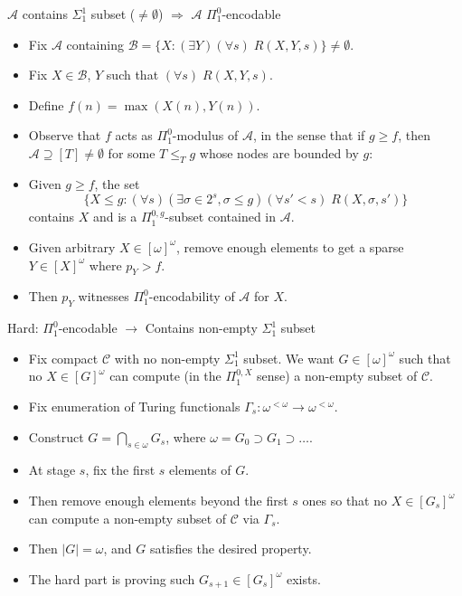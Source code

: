 \begin{frame}{$\mathcal{A}$ contains $\Sigma_1^1$ subset ($\neq\emptyset$)
$\Rightarrow$ $\mathcal{A}$ $\Pi_1^0$-encodable}
  \begin{itemize}
    \item Fix $\mathcal{A}$ containing $\mathcal{B} =\{X: (\exists
      Y)(\forall s)\; R(X,Y,s)\} \neq\emptyset$.
    \item Fix $X\in\mathcal{B}$, $Y$ such that $(\forall s)\;R(X,Y,s)$.
    \item Define $f(n)=\max(X(n),Y(n))$.
    \item Observe that $f$ acts as $\Pi_1^0$-modulus of $\mathcal{A}$, in
      the sense that if $g\geq f$, then $\mathcal{A}\supseteq[T]
      \neq\emptyset$ for some $T\leq_T g$ whose nodes are bounded by $g$:
    \item Given $g\geq f$, the set
      \[\{X\leq g:(\forall s)(\exists \sigma\in 2^s, \sigma\leq g)(\forall
      s'<s)\; R(X,\sigma,s')\}\]
      contains $X$ and is a $\Pi_1^{0,g}$-subset contained in
      $\mathcal{A}$.
    \item Given arbitrary $X\in[\omega]^\omega$, remove enough elements to
      get a sparse $Y\in[X]^\omega$ where $p_Y>f$.
    \item Then $p_Y$ witnesses $\Pi_1^0$-encodability of $\mathcal{A}$ for
      $X$.
  \end{itemize}
\end{frame}

\begin{frame}{Hard: $\Pi_1^0$-encodable $\rightarrow$ Contains
non-empty $\Sigma_1^1$ subset}
  \begin{itemize}
    \item Fix compact $\mathcal{C}$ with no non-empty $\Sigma_1^1$ subset.
      We want $G\in[\omega]^\omega$ such that no $X\in[G]^\omega$
      can compute (in the $\Pi_1^{0,X}$ sense) a non-empty subset of
      $\mathcal{C}$.

    \item Fix enumeration of Turing functionals $\Gamma_s:\omega^{<\omega}
      \rightarrow \omega^{<\omega}$.

    \item Construct $G=\bigcap_{s\in\omega}G_s$, where
      $\omega=G_0\supset G_1\supset\ldots$.
      
    \item At stage $s$, fix the first $s$ elements of $G$.
    
    \item Then remove enough elements beyond the first $s$ ones so that no
      $X\in[G_s]^\omega$ can compute a non-empty subset of $\mathcal{C}$
      via $\Gamma_s$.

    \item Then $|G|=\omega$, and $G$ satisfies the desired property.

    \item The hard part is proving such $G_{s+1}\in[G_s]^\omega$ exists.
  \end{itemize}
\end{frame}

